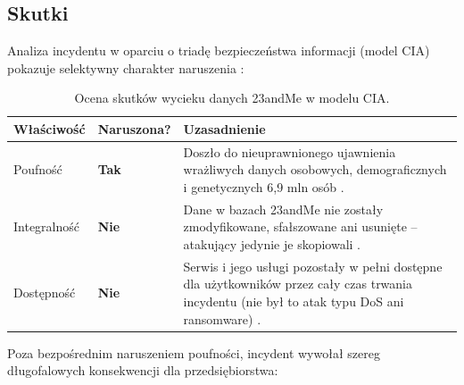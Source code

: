 \documentclass[12pt,a4paper]{article}
\begin{document}
\subsection{Skutki}

Analiza incydentu w oparciu o triadę bezpieczeństwa informacji (model CIA) pokazuje selektywny charakter naruszenia \cite{wiki23, sec23}:

\begin{table}[h]
    \centering
    \begin{tabular}{p{3cm} p{2.5cm} p{8.5cm}}
        \toprule
        \textbf{Właściwość} & \textbf{Naruszona?} & \textbf{Uzasadnienie} \\
        \midrule
        Poufność & \textbf{Tak} & Doszło do nieuprawnionego ujawnienia wrażliwych danych osobowych, demograficznych i genetycznych 6,9 mln osób \cite{sec23}. \\
        Integralność & \textbf{Nie} & Dane w bazach 23andMe nie zostały zmodyfikowane, sfałszowane ani usunięte – atakujący jedynie je skopiowali \cite{wiki23}. \\
        Dostępność & \textbf{Nie} & Serwis i jego usługi pozostały w pełni dostępne dla użytkowników przez cały czas trwania incydentu (nie był to atak typu DoS ani ransomware) \cite{sec23}. \\
        \bottomrule
    \end{tabular}
    \caption{Ocena skutków wycieku danych 23andMe w modelu CIA.}
\end{table}

Poza bezpośrednim naruszeniem poufności, incydent wywołał szereg długofalowych konsekwencji dla przedsiębiorstwa:
\end{document}
